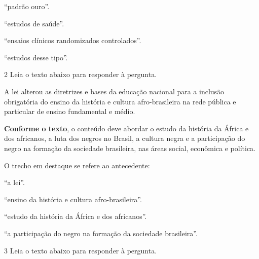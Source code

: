 {\begin{escolha}
  \item ``padrão ouro''.
  
  \item ``estudos de saúde''.
  
  \item ``ensaios clínicos randomizados controlados''.
  
  \item ``estudos desse tipo''. 

\end{escolha}


\num{2} Leia o texto abaixo para responder à pergunta.

\begin{myquote}

A lei alterou as diretrizes e bases da educação nacional para a
inclusão obrigatória do ensino da história e cultura afro-brasileira na
rede pública e particular de ensino fundamental e médio.

\textbf{Conforme o texto}, o conteúdo deve abordar o estudo da história
da África e dos africanos, a luta dos negros no Brasil, a cultura negra
e a participação do negro na formação da sociedade brasileira, nas áreas
social, econômica e política.

\end{myquote}


O trecho em destaque se refere ao antecedente:

\begin{escolha}
  
  \item ``a lei''.
  
  \item ``ensino da história e cultura afro-brasileira''.
  
  \item ``estudo da história da África e dos africanos''.
  
  \item ``a participação do negro na formação da sociedade brasileira''.

\end{escolha}

\num{3} Leia o texto abaixo para responder à pergunta.

}
